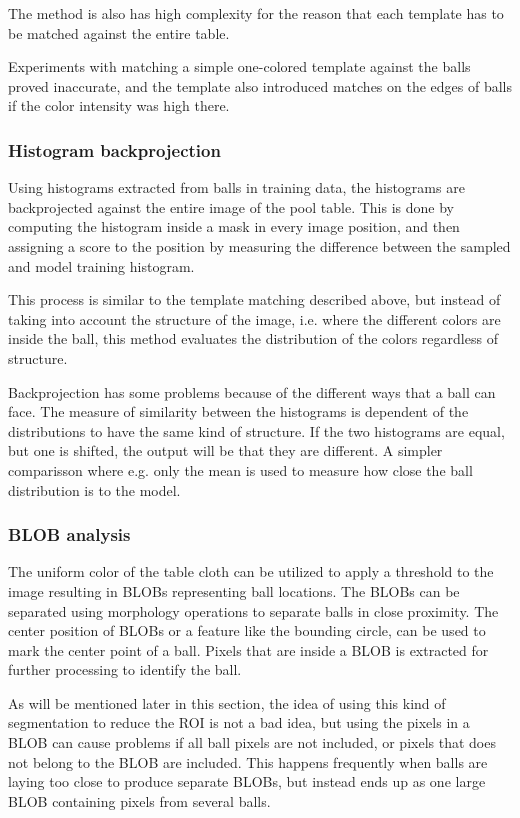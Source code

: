 The method is also has high complexity for the reason that each template has to be matched against the entire table.

Experiments with matching a simple one-colored template against the balls proved inaccurate, and the template also introduced matches on the edges of balls if the color intensity was high there.

\subsubsection{Histogram backprojection}
Using histograms extracted from balls in training data, the histograms are backprojected against the entire image of the pool table. This is done by computing the histogram inside a mask in every image position, and then assigning a score to the position by measuring the difference between the sampled and model training histogram.

This process is similar to the template matching described above, but instead of taking into account the structure of the image, i.e. where the different colors are inside the ball, this method evaluates the distribution of the colors regardless of structure.

Backprojection has some problems because of the different ways that a ball can face. The measure of similarity between the histograms is dependent of the distributions to have the same kind of structure. If the two histograms are equal, but one is shifted, the output will be that they are different. A simpler comparisson where e.g. only the mean is used to measure how close the ball distribution is to the model.

\subsubsection{BLOB analysis}
The uniform color of the table cloth can be utilized to apply a threshold to the image resulting in BLOBs representing ball locations. The BLOBs can be separated using morphology operations to separate balls in close proximity. The center position of BLOBs or a feature like the bounding circle, can be used to mark the center point of a ball. Pixels that are inside a BLOB is extracted for further processing to identify the ball.

As will be mentioned later in this section, the idea of using this kind of segmentation to reduce the ROI is not a bad idea, but using the pixels in a BLOB can cause problems if all ball pixels are not included, or pixels that does not belong to the BLOB are included. This happens frequently when balls are laying too close to produce separate BLOBs, but instead ends up as one large BLOB containing pixels from several balls.

